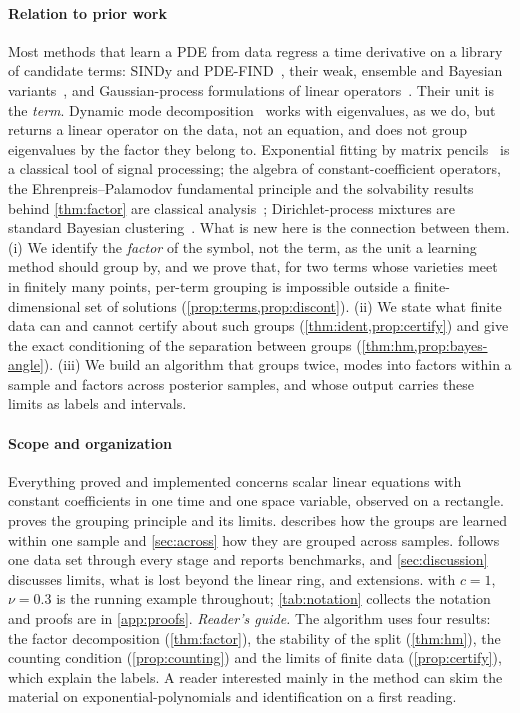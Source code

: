 \documentclass[11pt]{article}
\theoremstyle{plain}
\theoremstyle{definition}
\theoremstyle{remark}
\begin{document}
\paragraph{Relation to prior work}
Most methods that learn a PDE from data regress a time derivative on a library of candidate terms: SINDy and
PDE-FIND~\cite{BruProKut16,RudBruProKut17}, their weak, ensemble and Bayesian variants~\cite{MesBor21,FasKutBru22,HirBarKut22},
and Gaussian-process formulations of linear operators~\cite{RaiPerKar17}. Their unit is the \emph{term}. Dynamic mode
decomposition~\cite{Sch10,SasKut22} works with eigenvalues, as we do, but returns a linear operator on the data, not an
equation, and does not group eigenvalues by the factor they belong to. Exponential fitting by matrix
pencils~\cite{HuaSar90} is a classical tool of signal processing; the algebra of constant-coefficient operators, the
Ehrenpreis--Palamodov fundamental principle and the solvability results behind \cref{thm:factor} are classical
analysis~\cite{Ehr70,Pal70,Mal56,Hor90,Obe90}; Dirichlet-process mixtures are standard Bayesian
clustering~\cite{BleJor06}. What is new here is the connection between them. (i) We identify the \emph{factor} of the
symbol, not the term, as the unit a learning method should group by, and we prove that, for two terms whose varieties meet in finitely many points, per-term grouping is impossible
outside a finite-dimensional set of solutions (\cref{prop:terms,prop:discont}). (ii) We state what finite data can and
cannot certify about such groups (\cref{thm:ident,prop:certify}) and give the exact conditioning of the
separation between groups (\cref{thm:hm,prop:bayes-angle}). (iii) We build an algorithm that groups twice, modes into
factors within a sample and factors across posterior samples, and whose output carries these limits as labels and
intervals.



\paragraph{Scope and organization} Everything proved and implemented concerns scalar linear equations with constant
coefficients in one time and one space variable, observed on a rectangle.  proves the grouping principle
and its limits.  describes how the groups are
learned within one sample and \cref{sec:across} how they are grouped across samples.  follows one data
set through every stage and reports benchmarks, and \cref{sec:discussion} discusses limits, what is lost beyond the linear ring, and extensions. 
with $c=1$, $\nu=0.3$ is the running example throughout; \cref{tab:notation} collects the notation and proofs are in
\cref{app:proofs}. \emph{Reader's guide.} The algorithm uses four results: the factor decomposition (\cref{thm:factor}), the
stability of the split (\cref{thm:hm}), the counting condition (\cref{prop:counting}) and the limits of finite data
(\cref{prop:certify}), which explain the labels. A reader interested mainly in the method can skim the material on
exponential-polynomials and identification on a first reading.
\end{document}
